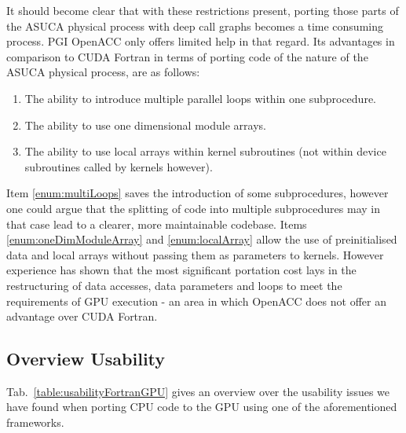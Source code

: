 It should become clear that with these restrictions present, porting those parts of the ASUCA physical process with deep call graphs becomes a time consuming process. PGI OpenACC only offers limited help in that regard. Its advantages in comparison to CUDA Fortran in terms of porting code of the nature of the ASUCA physical process, are as follows: 
\begin{enumerate}
 \item \label{enum:multiLoops} The ability to introduce multiple parallel loops within one subprocedure.
 \item \label{enum:oneDimModuleArray} The ability to use one dimensional module arrays.
 \item \label{enum:localArray} The ability to use local arrays within kernel subroutines (not within device subroutines called by kernels however).
\end{enumerate}

Item \ref{enum:multiLoops} saves the introduction of some subprocedures, however one could argue that the splitting of code into multiple subprocedures may in that case lead to a clearer, more maintainable codebase. Items \ref{enum:oneDimModuleArray} and \ref{enum:localArray} allow the use of preinitialised data and local arrays without passing them as parameters to kernels. However experience has shown that the most significant portation cost lays in the restructuring of data accesses, data parameters and loops to meet the requirements of GPU execution - an area in which OpenACC does not offer an advantage over CUDA Fortran.


\subsection{Overview Usability} \label{sub:overviewUsability}

Tab.~\ref{table:usabilityFortranGPU} gives an overview over the usability issues we have found when porting CPU code to the GPU using one of the aforementioned frameworks.

